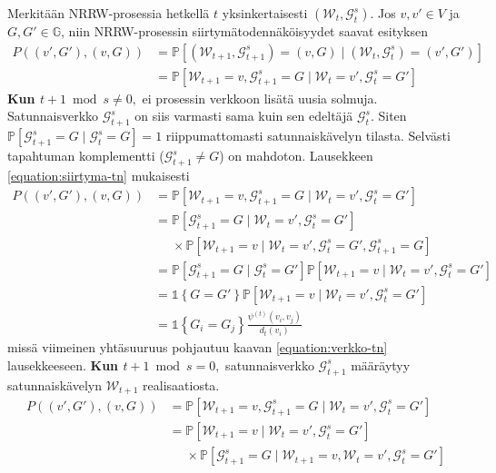 \documentclass[finnish, 12pt, a4paper, sci, utf8, pdfa]{aaltothesis}
\newcommand{\Grandom}{\mathcal{G}}
\newcommand{\Wrandom}{\mathcal{W}}
\newcommand{\indicator}{\mathopen{\mathds{1}}}
\newcommand*{\prob}{\mathbb{P}}
\begin{document}
Merkitään NRRW-prosessia hetkellä $ t $ yksinkertaisesti $ (\Wrandom_{t}, \Grandom^{s}_{t}) $. Jos $ v, v' \in V $ ja $ G, G' \in \mathbb{G} $, niin NRRW-prosessin siirtymätodennäköisyydet saavat esityksen
\begin{align}
   P\left( (v', G'), (v, G) \right) &= \prob \left[ (\Wrandom_{t+1}, \Grandom^{s}_{t+1}) = (v, G) \mid (\Wrandom_{t}, \Grandom^{s}_{t}) = (v', G') \right] \\
                                    &= \prob \left[ \Wrandom_{t+1} = v, \Grandom^{s}_{t+1} = G \mid \Wrandom_{t} = v', \Grandom^{s}_{t} = G' \right]
   \label{equation:siirtyma-tn}
\end{align}
\textbf{Kun $ t + 1 \bmod s \neq 0, $} ei prosessin verkkoon lisätä uusia solmuja. Satunnaisverkko $ \Grandom^{s}_{t+1} $ on siis varmasti sama kuin sen edeltäjä $ \Grandom^{s}_{t} $. Siten
$ \prob \left[ \Grandom^{s}_{t+1} = G \mid \Grandom^{s}_{t} = G \right] = 1 $
riippumattomasti satunnaiskävelyn tilasta. Selvästi tapahtuman komplementti ($ \Grandom^{s}_{t+1} \neq G $) on mahdoton. Lausekkeen \ref{equation:siirtyma-tn} mukaisesti
\begin{align*}
   P\left( (v', G'), (v, G) \right) &= \prob \left[ \Wrandom_{t+1} = v, \Grandom^{s}_{t+1} = G \mid \Wrandom_{t} = v', \Grandom^{s}_{t} = G' \right] \\
   &= \prob \left[ \Grandom^{s}_{t+1} = G \mid \Wrandom_{t} = v', \Grandom^{s}_{t} = G' \right] \\
   &\mathrel{\phantom{=}} \times \prob \left[ \Wrandom_{t+1} = v \mid \Wrandom_{t} = v', \Grandom^{s}_{t} = G', \Grandom^{s}_{t+1} = G \right] \\
   &= \prob \left[ \Grandom^{s}_{t+1} = G \mid \Grandom^{s}_{t} = G' \right] \prob \left[ \Wrandom_{t+1} = v \mid \Wrandom_{t} = v', \Grandom^{s}_{t} = G' \right] \\
   &= \indicator \left\{ G = G' \right\} \prob \left[ \Wrandom_{t+1} = v \mid \Wrandom_{t} = v', \Grandom^{s}_{t} = G' \right] \\
   &= \indicator \left\{ G_{i} = G_{j} \right\} \frac{\psi^{(t)}(v_{i}, v_{j})}{d_{t}(v_{i})}
\end{align*}
missä viimeinen yhtäsuuruus pohjautuu kaavan \ref{equation:verkko-tn} lausekkeeseen.
\newline
\textbf{Kun $ t + 1 \bmod s = 0, $} satunnaisverkko $ \Grandom^{s}_{t+1} $ määräytyy satunnaiskävelyn $ \Wrandom_{t+1} $ realisaatiosta.
\begin{align*}
   P\left( (v', G'), (v, G) \right) &= \prob \left[ \Wrandom_{t+1} = v, \Grandom^{s}_{t+1} = G \mid \Wrandom_{t} = v', \Grandom^{s}_{t} = G' \right] \\
   &= \prob \left[ \Wrandom_{t+1} = v \mid \Wrandom_{t} = v', \Grandom^{s}_{t} = G' \right] \\
   &\mathrel{\phantom{=}} \times \prob \left[ \Grandom^{s}_{t+1} = G \mid \Wrandom_{t+1} = v, \Wrandom_{t} = v', \Grandom^{s}_{t} = G' \right]
\end{align*}
\end{document}
